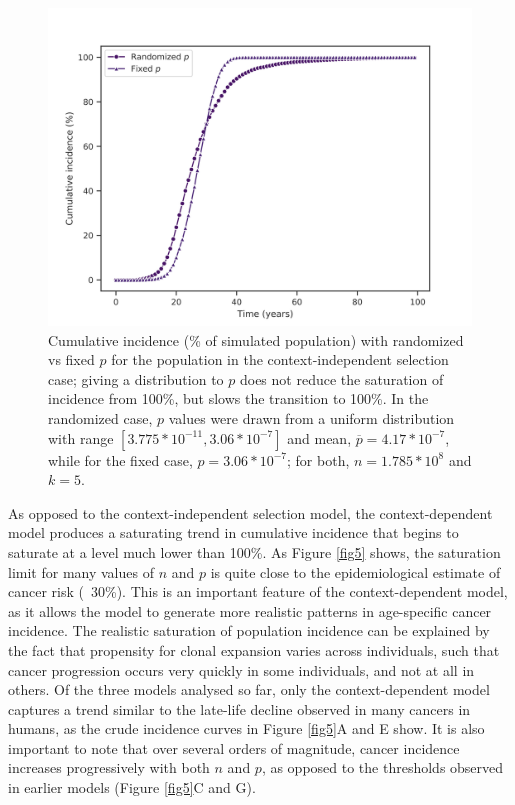 \documentclass[10pt,twocolumn,twoside]{article}
\begin{document}
\begin{figure}[tbhp]
	\centering
	\includegraphics[width=\linewidth, keepaspectratio=true]{fig4.png}
	\caption{Cumulative incidence (\% of simulated population) with randomized vs fixed $p$ for the population in the context-independent selection case; giving a distribution to $p$ does not reduce the saturation of incidence from 100\%, but slows the transition to 100\%. In the randomized case, $p$ values were drawn from a uniform distribution with range $[3.775*10^{-11}, 3.06*10^{-7}]$ and mean, $\overline{p} = 4.17*10^{-7}$, while for the fixed case, $p=3.06*10^{-7}$; for both, $n=1.785*10^{8}$ and $k=5$.} 
	\label{fig4}
\end{figure}

As opposed to the context-independent selection model, the context-dependent model produces a saturating trend in cumulative incidence that begins to saturate at a level much lower than 100\%. As Figure \ref{fig5} shows, the saturation limit for many values of $n$ and $p$ is quite close to the epidemiological estimate of cancer risk (~30\%). This is an important feature of the context-dependent model, as it allows the model to generate more realistic patterns in age-specific cancer incidence. The realistic saturation of population incidence can be explained by the fact that propensity for clonal expansion varies across individuals, such that cancer progression occurs very quickly in some individuals, and not at all in others. Of the three models analysed so far, only the context-dependent model captures a trend similar to the late-life decline observed in many cancers in humans, as the crude incidence curves in Figure \ref{fig5}A and E show. It is also important to note that over several orders of magnitude, cancer incidence increases progressively with both $n$ and $p$, as opposed to the thresholds observed in earlier models (Figure \ref{fig5}C and G).
\end{document}
